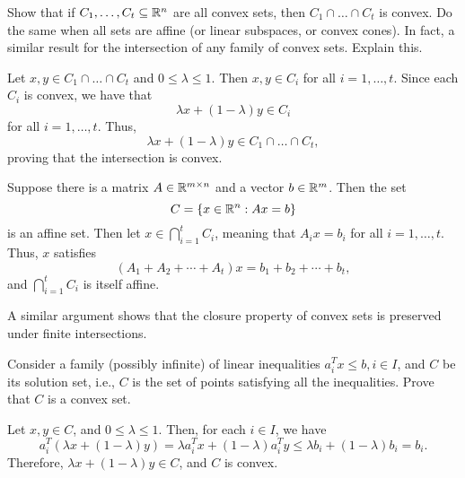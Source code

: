 \begin{exercise}
  Show that if $C_1, \dots, C_t \subseteq \mathbb{R}^n$ are all convex sets, then $C_1 \cap \dots \cap C_t$ is convex.
  Do the same when all sets are affine (or linear subspaces, or convex cones).
  In fact, a similar result for the intersection of any family of convex sets.
  Explain this.
\end{exercise}

\begin{solution}
  Let $x, y \in C_1 \cap \dots \cap C_t$ and $0 \leq \lambda \leq 1$. Then $x, y \in C_i$ for all $i = 1, \dots, t$. Since each $C_i$ is convex, we have that
  \begin{equation}
    \lambda x + (1 - \lambda) y \in C_i
  \end{equation}
  for all $i = 1, \dots, t$. Thus,
  \begin{equation}
    \lambda x + (1 - \lambda) y \in C_1 \cap \dots \cap C_t,
  \end{equation}
  proving that the intersection is convex.

  Suppose there is a matrix $A \in \mathbb{R}^{m \times n}$ and a vector $b \in \mathbb{R}^m$.
  Then the set
  \begin{equation}
    C = \{ x \in \mathbb{R}^n : Ax = b \}
  \end{equation}
  is an affine set.
  Then let $x \in \bigcap_{i = 1}^t C_i$, meaning that $A_i x = b_i$ for all $i = 1, \dots, t$.
  Thus, $x$ satisfies
  \begin{equation}
    (A_1 + A_2 + \cdots + A_t) x = b_1 + b_2 + \cdots + b_t,
  \end{equation}
  and $\bigcap_{i = 1}^t C_i$ is itself affine.

  A similar argument shows that the closure property of convex sets is preserved under finite intersections.
\end{solution}

\begin{exercise}
  Consider a family (possibly infinite) of linear inequalities $a_i^T x \leq b, i \in I$, and $C$ be its solution set, i.e., $C$ is the set of points satisfying all the inequalities.
  Prove that $C$ is a convex set.
\end{exercise}

\begin{solution}
  Let $x, y \in C$, and $0 \leq \lambda \leq 1$.
  Then, for each $i \in I$, we have
  \begin{equation}
    a_i^T (\lambda x + (1 - \lambda) y) = \lambda a_i^T x + (1 - \lambda) a_i^T y \leq \lambda b_i + (1 - \lambda) b_i = b_i.
  \end{equation}
  Therefore, $\lambda x + (1 - \lambda) y \in C$, and $C$ is convex.
\end{solution}

